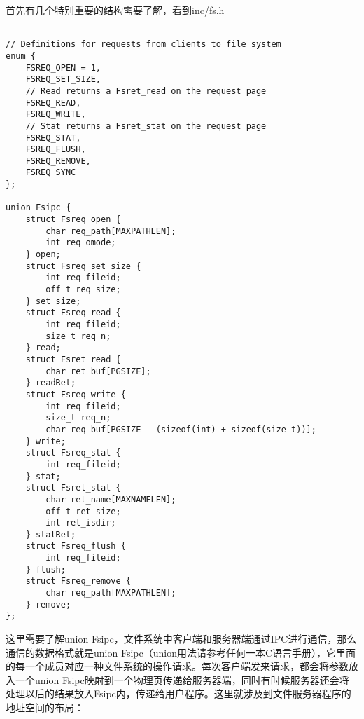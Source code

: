\documentclass{article}
\begin{document}
\begin{CJK*}{UTF8}{gkai}
首先有几个特别重要的结构需要了解，看到inc/fs.h

\begin{lstlisting}[style=ccode, firstnumber=61, title={\scriptsize \ttfamily \bfseries inc/fs.h}]

// Definitions for requests from clients to file system
enum {
	FSREQ_OPEN = 1,
	FSREQ_SET_SIZE,
	// Read returns a Fsret_read on the request page
	FSREQ_READ,
	FSREQ_WRITE,
	// Stat returns a Fsret_stat on the request page
	FSREQ_STAT,
	FSREQ_FLUSH,
	FSREQ_REMOVE,
	FSREQ_SYNC
};

union Fsipc {
	struct Fsreq_open {
		char req_path[MAXPATHLEN];
		int req_omode;
	} open;
	struct Fsreq_set_size {
		int req_fileid;
		off_t req_size;
	} set_size;
	struct Fsreq_read {
		int req_fileid;
		size_t req_n;
	} read;
	struct Fsret_read {
		char ret_buf[PGSIZE];
	} readRet;
	struct Fsreq_write {
		int req_fileid;
		size_t req_n;
		char req_buf[PGSIZE - (sizeof(int) + sizeof(size_t))];
	} write;
	struct Fsreq_stat {
		int req_fileid;
	} stat;
	struct Fsret_stat {
		char ret_name[MAXNAMELEN];
		off_t ret_size;
		int ret_isdir;
	} statRet;
	struct Fsreq_flush {
		int req_fileid;
	} flush;
	struct Fsreq_remove {
		char req_path[MAXPATHLEN];
	} remove;
};
\end{lstlisting}

这里需要了解union Fsipc，文件系统中客户端和服务器端通过IPC进行通信，那么通信的数据格式就是union Fsipc（union用法请参考任何一本C语言手册），它里面的每一个成员对应一种文件系统的操作请求。每次客户端发来请求，都会将参数放入一个union Fsipc映射到一个物理页传递给服务器端，同时有时候服务器还会将处理以后的结果放入Fsipc内，传递给用户程序。这里就涉及到文件服务器程序的地址空间的布局：


\end{CJK*}
\end{document}

